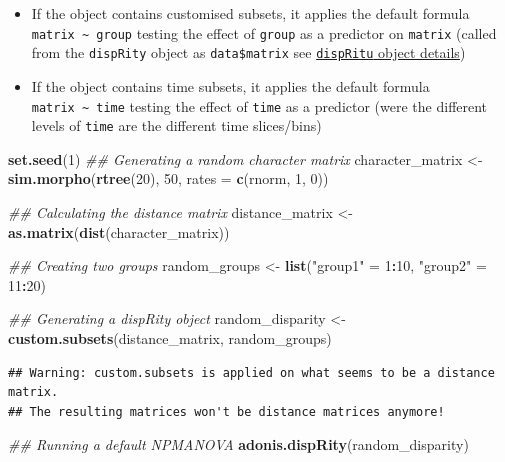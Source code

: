 \documentclass[]{book}
\newenvironment{Shaded}{\begin{snugshade}}{\end{snugshade}}
\newcommand{\CommentTok}[1]{\textcolor[rgb]{0.56,0.35,0.01}{\textit{#1}}}
\newcommand{\DataTypeTok}[1]{\textcolor[rgb]{0.13,0.29,0.53}{#1}}
\newcommand{\DecValTok}[1]{\textcolor[rgb]{0.00,0.00,0.81}{#1}}
\newcommand{\KeywordTok}[1]{\textcolor[rgb]{0.13,0.29,0.53}{\textbf{#1}}}
\newcommand{\NormalTok}[1]{#1}
\newcommand{\OperatorTok}[1]{\textcolor[rgb]{0.81,0.36,0.00}{\textbf{#1}}}
\newcommand{\StringTok}[1]{\textcolor[rgb]{0.31,0.60,0.02}{#1}}
\providecommand{\tightlist}{%
  \setlength{\itemsep}{0pt}\setlength{\parskip}{0pt}}
\begin{document}
\begin{itemize}
\tightlist
\item
  If the object contains customised subsets, it applies the default formula \texttt{matrix\ \textasciitilde{}\ group} testing the effect of \texttt{group} as a predictor on \texttt{matrix} (called from the \texttt{dispRity} object as \texttt{data\$matrix} see \protect\hyperlink{The-dispRity-object-content}{\texttt{dispRitu} object details})
\item
  If the object contains time subsets, it applies the default formula \texttt{matrix\ \textasciitilde{}\ time} testing the effect of \texttt{time} as a predictor (were the different levels of \texttt{time} are the different time slices/bins)
\end{itemize}

\begin{Shaded}
\begin{Highlighting}[]
\KeywordTok{set.seed}\NormalTok{(}\DecValTok{1}\NormalTok{)}
\CommentTok{## Generating a random character matrix}
\NormalTok{character_matrix <-}\StringTok{ }\KeywordTok{sim.morpho}\NormalTok{(}\KeywordTok{rtree}\NormalTok{(}\DecValTok{20}\NormalTok{), }\DecValTok{50}\NormalTok{,}
                               \DataTypeTok{rates =} \KeywordTok{c}\NormalTok{(rnorm, }\DecValTok{1}\NormalTok{, }\DecValTok{0}\NormalTok{))}

\CommentTok{## Calculating the distance matrix}
\NormalTok{distance_matrix <-}\StringTok{ }\KeywordTok{as.matrix}\NormalTok{(}\KeywordTok{dist}\NormalTok{(character_matrix))}

\CommentTok{## Creating two groups}
\NormalTok{random_groups <-}\StringTok{ }\KeywordTok{list}\NormalTok{(}\StringTok{"group1"}\NormalTok{ =}\StringTok{ }\DecValTok{1}\OperatorTok{:}\DecValTok{10}\NormalTok{, }\StringTok{"group2"}\NormalTok{ =}\StringTok{ }\DecValTok{11}\OperatorTok{:}\DecValTok{20}\NormalTok{)}

\CommentTok{## Generating a dispRity object}
\NormalTok{random_disparity <-}\StringTok{ }\KeywordTok{custom.subsets}\NormalTok{(distance_matrix, random_groups)}
\end{Highlighting}
\end{Shaded}

\begin{verbatim}
## Warning: custom.subsets is applied on what seems to be a distance matrix.
## The resulting matrices won't be distance matrices anymore!
\end{verbatim}

\begin{Shaded}
\begin{Highlighting}[]
\CommentTok{## Running a default NPMANOVA}
\KeywordTok{adonis.dispRity}\NormalTok{(random_disparity)}
\end{Highlighting}
\end{Shaded}
\end{document}
